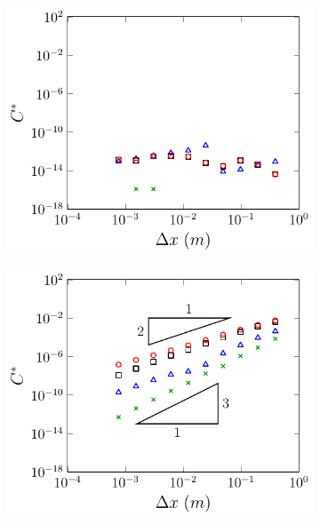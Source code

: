 \begin{figure}
	\centering
	\begin{subfigure}{0.5\textwidth}
		\includegraphics[width=\textwidth]{./chp5/figures/Analytic/LakeAtRest/C1/Num/FEVM2WB.pdf}
		\vspace{0.5cm}
	\end{subfigure}%
	\begin{subfigure}{0.5\textwidth}
		\includegraphics[width=\textwidth]{./chp5/figures/Analytic/LakeAtRest/C1/Num/FEVM2nWB.pdf}
		\vspace{0.5cm}

\end{subfigure}
\end{figure}
